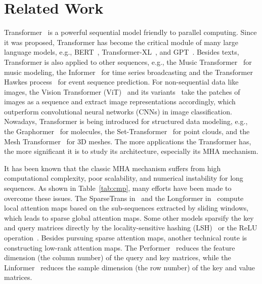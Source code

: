 \section{Related Work}\label{sec:related}
Transformer~\cite{vaswani2017attention} is a powerful sequential model friendly to parallel computing. 
Since it was proposed, Transformer has become the critical module of many large language models, e.g., BERT~\cite{devlin2019bert}, Transformer-XL~\cite{dai2019transformer}, and GPT~\cite{brown2020language}. 
Besides texts, Transformer is also applied to other sequences, e.g., the Music Transformer~\cite{huang2018music} for music modeling, the Informer~\cite{zhang2021informer} for time series broadcasting and the Transformer Hawkes process~\cite{zuo2020transformer} for event sequence prediction. 
For non-sequential data like images, the Vision Transformer (ViT)~\cite{dosovitskiy2021an} and its variants~\cite{liu2021swin,chen2021visformer} take the patches of images as a sequence and extract image representations accordingly, which outperform convolutional neural networks (CNNs) in image classification.
Nowadays, Transformer is being introduced for structured data modeling, e.g., the Graphormer~\cite{ying2021transformers} for molecules, the Set-Transformer~\cite{lee2019set} for point clouds, and the Mesh Transformer~\cite{lin2021mesh} for 3D meshes. 
The more applications the Transformer has, the more significant it is to study its architecture, especially its MHA mechanism. 

It has been known that the classic MHA mechanism suffers from high computational complexity, poor scalability, and numerical instability for long sequences. 
As shown in Table~\ref{tab:cmp}, many efforts have been made to overcome these issues. 
The SparseTrans in~\cite{child2019generating} and the Longformer in~\cite{beltagy2020longformer} compute local attention maps based on the sub-sequences extracted by sliding windows, which leads to sparse global attention maps.
Some other models sparsify the key and query matrices directly by the locality-sensitive hashing (LSH)~\cite{kitaev2020reformer} or the ReLU operation~\cite{zhen2022cosformer}. 
Besides pursuing sparse attention maps, another technical route is constructing low-rank attention maps. 
The Performer~\cite{choromanski2021rethinking} reduces the feature dimension (the column number) of the query and key matrices, while the Linformer~\cite{wang2020linformer} reduces the sample dimension (the row number) of the key and value matrices. 

